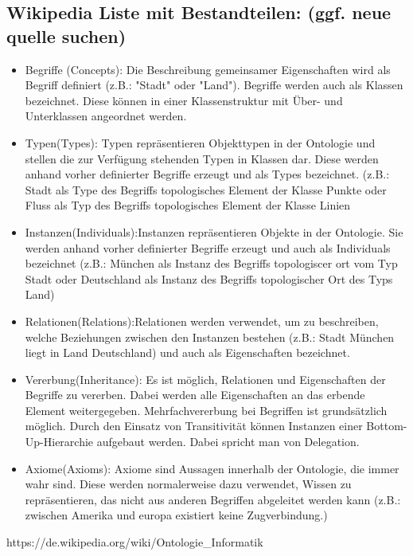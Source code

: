 \subsection*{Wikipedia Liste mit Bestandteilen: (ggf. neue quelle suchen)}
\begin{itemize}
	\item Begriffe (Concepts): Die Beschreibung gemeinsamer Eigenschaften wird als Begriff definiert (z.B.: "Stadt" oder "Land"). Begriffe werden auch als Klassen bezeichnet. Diese können in einer Klassenstruktur mit Über- und Unterklassen angeordnet werden.
	\item Typen(Types): Typen repräsentieren Objekttypen in der Ontologie und stellen die zur Verfügung stehenden Typen in Klassen dar. Diese werden anhand vorher definierter Begriffe erzeugt und als Types bezeichnet. (z.B.: Stadt als Type des Begriffs topologisches Element der Klasse Punkte oder Fluss als Typ des Begriffs topologisches Element der Klasse Linien
	\item Instanzen(Individuals):Instanzen repräsentieren Objekte in der Ontologie. Sie werden anhand vorher definierter Begriffe erzeugt und auch als Individuals bezeichnet (z.B.: München als Instanz des Begriffs topologiscer ort vom Typ Stadt oder Deutschland als Instanz des Begriffs topologischer Ort des Typs Land)
	\item Relationen(Relations):Relationen werden verwendet, um zu beschreiben, welche Beziehungen zwischen den Instanzen bestehen (z.B.: Stadt München liegt in Land Deutschland) und auch als Eigenschaften bezeichnet.
	\item Vererbung(Inheritance): Es ist möglich, Relationen und Eigenschaften der Begriffe zu vererben. Dabei werden alle Eigenschaften an das erbende Element weitergegeben. Mehrfachvererbung bei Begriffen ist grundsätzlich möglich. Durch den Einsatz von Transitivität können Instanzen einer Bottom-Up-Hierarchie aufgebaut werden. Dabei spricht man von Delegation.
	\item Axiome(Axioms): Axiome sind Aussagen innerhalb der Ontologie, die immer wahr sind. Diese werden normalerweise dazu verwendet, Wissen zu repräsentieren, das nicht aus anderen Begriffen abgeleitet werden kann (z.B.: zwischen Amerika und europa existiert keine Zugverbindung.)
\end{itemize}
	https://de.wikipedia.org/wiki/Ontologie\_Informatik

